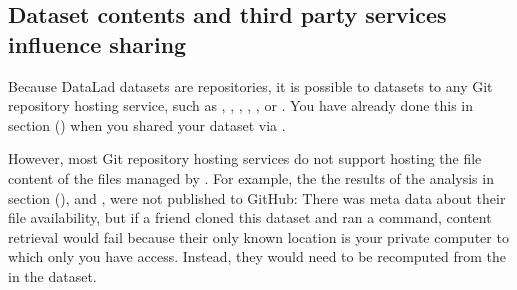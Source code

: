 \subsection{Dataset contents and third party services influence sharing}
\label{\detokenize{basics/101-138-sharethirdparty:dataset-contents-and-third-party-services-influence-sharing}}
\sphinxAtStartPar
Because DataLad datasets are {\hyperref[\detokenize{glossary:term-Git}]{}} repositories, it is possible to
 datasets to any Git repository hosting service, such as
{\hyperref[\detokenize{glossary:term-GitHub}]{}}, {\hyperref[\detokenize{glossary:term-GitLab}]{}}, {\hyperref[\detokenize{glossary:term-GIN}]{}}, {\hyperref[\detokenize{glossary:term-Bitbucket}]{}}, ,
or .
You have already done this in section {\hyperref[\detokenize{basics/101-130-yodaproject:yoda-project}]{}} () when you shared your  dataset via {\hyperref[\detokenize{glossary:term-GitHub}]{}}.

\sphinxAtStartPar
However, most Git repository hosting services do not support hosting the file content
of the files managed by {\hyperref[\detokenize{glossary:term-git-annex}]{}}.
For example, the the results of the analysis in section {\hyperref[\detokenize{basics/101-130-yodaproject:yoda-project}]{}} (),
 and , were not published to
GitHub: There was meta data about their file availability, but if a friend cloned
this dataset and ran a  command, content retrieval would fail
because their only known location is your private computer to which only you have access.
Instead, they would need to be recomputed from the {\hyperref[\detokenize{glossary:term-run-record}]{}} in the dataset.

